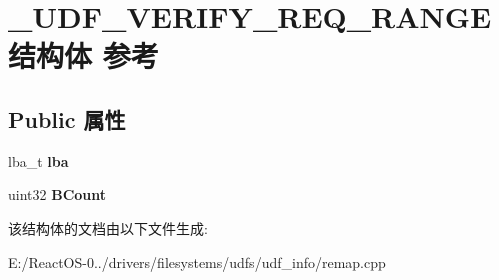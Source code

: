 \hypertarget{struct___u_d_f___v_e_r_i_f_y___r_e_q___r_a_n_g_e}{}\section{\+\_\+\+U\+D\+F\+\_\+\+V\+E\+R\+I\+F\+Y\+\_\+\+R\+E\+Q\+\_\+\+R\+A\+N\+G\+E结构体 参考}
\label{struct___u_d_f___v_e_r_i_f_y___r_e_q___r_a_n_g_e}
\subsection*{Public 属性}
\begin{DoxyCompactItemize}
\item 
\mbox{\label{struct___u_d_f___v_e_r_i_f_y___r_e_q___r_a_n_g_e_a46ae5cdee86a2290f07096685f568b05}} 
lba\+\_\+t {\bfseries lba}
\item 
\mbox{\label{struct___u_d_f___v_e_r_i_f_y___r_e_q___r_a_n_g_e_a7e9f2b24923659f36cd7c52db58f827e}} 
uint32 {\bfseries B\+Count}
\end{DoxyCompactItemize}


该结构体的文档由以下文件生成\+:\begin{DoxyCompactItemize}
\item 
E\+:/\+React\+O\+S-\/0../drivers/filesystems/udfs/udf\+\_\+info/remap.\+cpp\end{DoxyCompactItemize}
